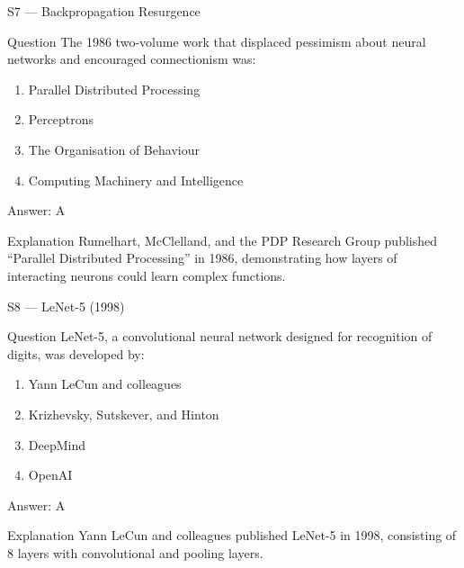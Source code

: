 \documentclass[aspectratio=169,8pt]{beamer}
\begin{document}
	\begin{frame}{S7 --- Backpropagation Resurgence}
		\begin{block}{Question}
			The 1986 two-volume work that displaced pessimism about neural networks and encouraged connectionism was:
			\begin{enumerate}
				\item Parallel Distributed Processing
				\item Perceptrons
				\item The Organisation of Behaviour
				\item Computing Machinery and Intelligence
			\end{enumerate}
		\end{block}
		\begin{exampleblock}{Answer: A}\end{exampleblock}
		\begin{block}{Explanation}
			Rumelhart, McClelland, and the PDP Research Group published ``Parallel Distributed Processing'' in 1986, demonstrating how layers of interacting neurons could learn complex functions.
		\end{block}
	\end{frame}
	
	\begin{frame}{S8 --- LeNet-5 (1998)}
		\begin{block}{Question}
			LeNet-5, a convolutional neural network designed for recognition of digits, was developed by:
			\begin{enumerate}
				\item Yann LeCun and colleagues
				\item Krizhevsky, Sutskever, and Hinton
				\item DeepMind
				\item OpenAI
			\end{enumerate}
		\end{block}
		\begin{exampleblock}{Answer: A}\end{exampleblock}
		\begin{block}{Explanation}
			Yann LeCun and colleagues published LeNet-5 in 1998, consisting of 8 layers with convolutional and pooling layers.
		\end{block}
	\end{frame}
	
\end{document}
